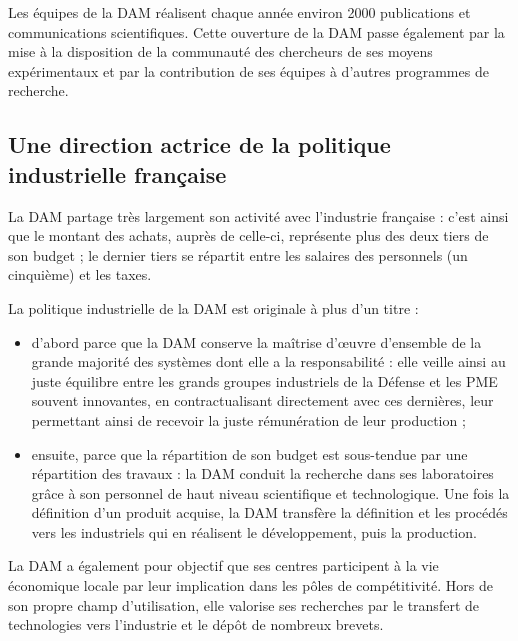 \documentclass[12pt,a4paper,twoside]{article}
\begin{document}
Les équipes de la DAM réalisent chaque année environ 2000 publications et
communications scientifiques. Cette ouverture de la DAM passe également par la
mise à la disposition de la communauté des chercheurs de ses moyens
expérimentaux et par la contribution de ses équipes à d'autres programmes de
recherche.

\subsection*{Une direction actrice de la politique industrielle française}
La DAM partage très largement son activité avec l'industrie française : c'est
ainsi que le montant des achats, auprès de celle-ci, représente plus des deux
tiers de son budget ; le dernier tiers se répartit entre les salaires des
personnels (un cinquième) et les taxes.

La politique industrielle de la DAM est originale à plus d'un titre :

\begin{itemize}[label=\textbullet]
	\item
		d'abord parce que la DAM conserve la maîtrise d'\oe uvre
		d'ensemble de la grande majorité des systèmes dont elle a la
		responsabilité : elle veille ainsi au juste équilibre entre les
		grands groupes industriels de la Défense et les PME souvent
		innovantes, en contractualisant directement avec ces dernières,
		leur permettant ainsi de recevoir la juste rémunération de leur
		production ;
	\item	
		ensuite, parce que la répartition de son budget est sous-tendue
		par une répartition des travaux : la DAM conduit la recherche
		dans ses laboratoires grâce à son personnel de haut niveau
		scientifique et technologique. Une fois la définition d'un
		produit acquise, la DAM transfère la définition et les procédés
		vers les industriels qui en réalisent le développement, puis la
		production.
\end{itemize}

La DAM a également pour objectif que ses centres participent à la vie économique
locale par leur implication dans les pôles de compétitivité. Hors de son propre
champ d'utilisation, elle valorise ses recherches par le transfert de
technologies vers l'industrie et le dépôt de nombreux brevets.
\end{document}
